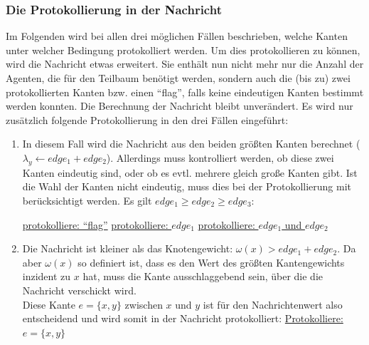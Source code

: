 \subsubsection{Die Protokollierung in der Nachricht}

Im Folgenden wird bei allen drei möglichen Fällen beschrieben, welche Kanten unter welcher Bedingung protokolliert werden. Um dies protokollieren zu können, wird die Nachricht etwas erweitert. Sie enthält nun nicht mehr nur die Anzahl der Agenten, die für den Teilbaum benötigt werden, sondern auch die (bis zu) zwei protokollierten Kanten bzw. einen "`flag"', falls keine eindeutigen Kanten bestimmt werden konnten. Die Berechnung der Nachricht bleibt unverändert. Es wird nur zusätzlich folgende Protokollierung in den drei Fällen eingeführt: 

\begin{enumerate}[label=\alph*)]
	
	\item In diesem Fall wird die Nachricht aus den beiden größten Kanten berechnet ($\lambda_{y} \gets edge_{1} + edge_{2}$). Allerdings muss kontrolliert werden, ob diese zwei Kanten eindeutig sind, oder ob es evtl. mehrere gleich große Kanten gibt. Ist die Wahl der Kanten nicht eindeutig, muss dies bei der Protokollierung mit berücksichtigt werden. Es gilt $edge_{1} \geq edge_{2} \geq edge_{3}$:

		\begin{algorithmic}
			\State \uline{protokolliere: "`flag"'}
			\State \uline{protokolliere: $edge_{1}$}
			\Else
			\State \uline{protokolliere: $edge_{1}$ und $edge_{2}$}
			\EndIf
		\end{algorithmic}
		
	\clearpage
		
	
	\item Die Nachricht ist kleiner als das Knotengewicht: $\omega(x) > edge_{1}+edge_{2}$. Da aber $\omega(x)$ so definiert ist, dass es den Wert des größten Kantengewichts inzident zu $x$ hat, muss die Kante ausschlaggebend sein, über die die Nachricht verschickt wird. 
	\\
	Diese Kante $e = \{x, y\}$ zwischen $x$ und $y$ ist für den Nachrichtenwert also entscheidend und wird somit in der Nachricht protokolliert: \uline{Protokolliere: $e = \{x, y\}$}
	

\end{enumerate}
